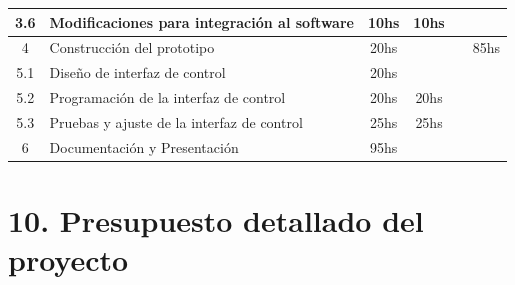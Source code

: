\documentclass[11pt]{charter}
\begin{document}
\begin{table}[htpb]
\begin{tabularx}{\textwidth}{@{}|c|p{12em}|p{5em}|p{4.5em}|p{4.5em}|X|@{}}
3.6 & Modificaciones para integración al software   & \multicolumn{1}{c|}{10hs} & \multicolumn{1}{c|}{10hs} &  &  \\ \hline   
4 & Construcción del prototipo & \multicolumn{1}{c|}{20hs} &  &  & \multicolumn{1}{c|}{85hs} \\ \hline
5.1 & Diseño de interfaz de control  & \multicolumn{1}{c|}{20hs} &  &  &  \\ \hline
5.2 &  Programación de la interfaz de control & \multicolumn{1}{c|}{20hs} & \multicolumn{1}{c|}{20hs} &  &  \\ \hline
5.3 & Pruebas y ajuste de la interfaz de control & \multicolumn{1}{c|}{25hs} & \multicolumn{1}{c|}{25hs} &  &  \\ \hline
6 & Documentación y Presentación & \multicolumn{1}{c|}{95hs} &  &  &  \\ \hline
\end{tabularx}%
\end{table}

\pagebreak

\section{10. Presupuesto detallado del proyecto}
\label{sec:presupuesto}
\end{document}
